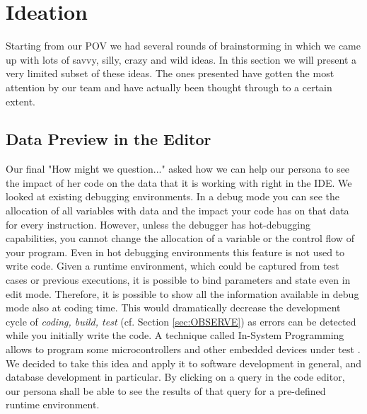 
\section{Ideation}
\label{sec:IDEATION}

Starting from our POV we had several rounds of brainstorming in which we came up with lots of savvy, silly, crazy and wild ideas. In this section we will present a very limited subset of these ideas. The ones presented have gotten the most attention by our team and have actually been thought through to a certain extent.

\subsection{Data Preview in the Editor}
Our final "How might we question..." asked how we can help our persona to see the impact of her code on the data that it is working with right in the IDE. We looked at existing debugging environments. In a debug mode you can see the allocation of all variables with data and the impact your code has on that data for every instruction. However, unless the debugger has hot-debugging capabilities, you cannot change the allocation of a variable or the control flow of your program. Even in hot debugging environments this feature is not used to write code.
Given a runtime environment, which could be captured from test cases or previous executions, it is possible to bind parameters and state even in edit mode. Therefore, it is possible to show all the information available in debug mode also at coding time. This would dramatically decrease the development cycle of \textit{coding, build, test} (cf. Section \ref{sec:OBSERVE}) as errors can be detected while you initially write the code. A technique called In-System Programming allows to program some microcontrollers and other embedded devices under test \cite{herrmann2002apparatus}.
We decided to take this idea and apply it to software development in general, and database development in particular.  By clicking on a query in the code editor, our persona shall be able to see the results of that query for a pre-defined runtime environment.

